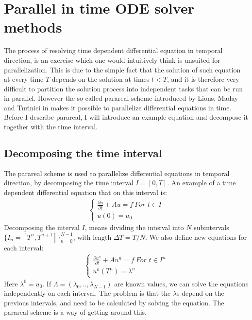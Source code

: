 \chapter{Parallel in time ODE solver methods}
The process of resolving time dependent differential equation in temporal direction, is an exercise which one would intuitively think is unsuited for parallelization. This is due to the simple fact that the solution of such equation at every time $T$ depends on the solution at times $t<T$, and it is therefore very difficult to partition the solution process into independent tasks that can be run in parallel. However the so called parareal scheme introduced by Lions, Maday and Turinici in \cite{lions2001resolution} makes it possible to parallelize differential equations in time. Before I describe parareal, I will introduce an example equation and decompose it together with the time interval.
\section{Decomposing the time interval}
The parareal scheme is used to parallelize differential equations in temporal direction, by decomposing the time interval $I=[0,T]$. An example of a time dependent differential equation that on this interval is:
\begin{align}
\left\{
     \begin{array}{lr}
		\frac{\partial u}{\partial t} + Au = f \ 				\textit{For $t \in I$} \\
		u(0)=u_0
	\end{array}
   \right.			
\end{align} 
Decomposing the interval $I$, means dividing the interval into $N$ subintervals $\{I_n = [T^{n},T^{n+1}]\}_{n=0}^{N-1}$, with length $\Delta T = T/N$. We also define new equations for each interval:
\begin{align}
\left\{
     \begin{array}{lr}
		\frac{\partial u^n}{\partial t} + Au^n = f \ 				\textit{For $t \in I^n$} \\
		u^n(T^n)=\lambda^n
	\end{array}
\right.	
\end{align}
Here $\lambda^0=u_0$. If $\Lambda=(\lambda_0,..,\lambda_{N-1})$ are known values, we can solve the equations independently on each interval. The problem is that the $\lambda$s depend on the previous intervals, and need to be calculated by solving the equation. The parareal scheme is a way of getting around this.
